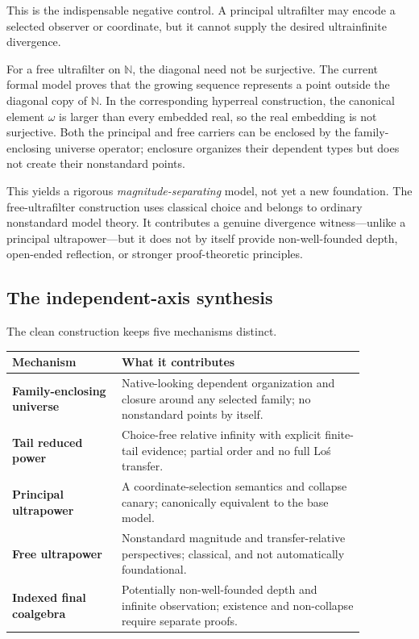 \documentclass[11pt]{article}
\theoremstyle{definition}
\theoremstyle{remark}
\begin{document}
This is the indispensable negative control.  A principal ultrafilter may encode
a selected observer or coordinate, but it cannot supply the desired
ultrainfinite divergence.

For a free ultrafilter on $\mathbb N$, the diagonal need not be surjective.  The
current formal model proves that the growing sequence represents a point outside
the diagonal copy of $\mathbb N$.  In the corresponding hyperreal construction,
the canonical element $\omega$ is larger than every embedded real, so the real
embedding is not surjective.  Both the principal and free carriers can be
enclosed by the family-enclosing universe operator; enclosure organizes their
dependent types but does not create their nonstandard points.

This yields a rigorous \emph{magnitude-separating} model, not yet a new
foundation.  The free-ultrafilter construction uses classical choice and belongs
to ordinary nonstandard model theory.  It contributes a genuine divergence
witness---unlike a principal ultrapower---but it does not by itself provide
non-well-founded depth, open-ended reflection, or stronger proof-theoretic
principles.

\subsection{The independent-axis synthesis}

The clean construction keeps five mechanisms distinct.

\begin{center}
\begin{tabular}{>{\raggedright\arraybackslash\bfseries}p{0.27\linewidth}
                >{\raggedright\arraybackslash}p{0.60\linewidth}}
\toprule
Mechanism & What it contributes \\
\midrule
Family-enclosing universe & Native-looking dependent organization and closure
  around any selected family; no nonstandard points by itself. \\
Tail reduced power & Choice-free relative infinity with explicit finite-tail
  evidence; partial order and no full Lo\'s transfer. \\
Principal ultrapower & A coordinate-selection semantics and collapse canary;
  canonically equivalent to the base model. \\
Free ultrapower & Nonstandard magnitude and transfer-relative perspectives;
  classical, and not automatically foundational. \\
Indexed final coalgebra & Potentially non-well-founded depth and infinite
  observation; existence and non-collapse require separate proofs. \\
\bottomrule
\end{tabular}
\end{center}
\end{document}

